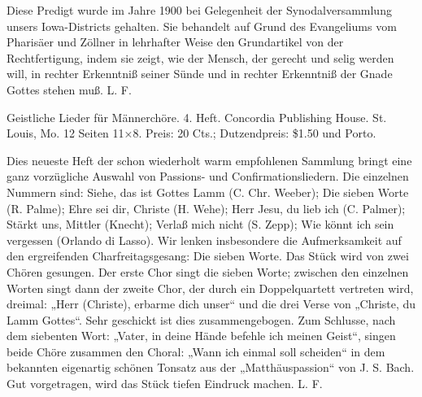 Diese Predigt wurde im Jahre 1900 bei Gelegenheit der Synodalversammlung unsers Iowa-Districts gehalten. Sie behandelt auf Grund des Evangeliums vom Pharisäer und Zöllner in lehrhafter Weise den Grundartikel von der Rechtfertigung, indem sie zeigt, wie der Mensch, der gerecht und selig werden will, in rechter Erkenntniß seiner Sünde und in rechter Erkenntniß der Gnade Gottes stehen muß. L. F.

Geistliche Lieder für Männerchöre. 4. Heft. Concordia Publishing House. St. Louis, Mo. 12 Seiten 11×8. Preis: 20 Cts.; Dutzendpreis: \$1.50 und Porto.

Dies neueste Heft der schon wiederholt warm empfohlenen Sammlung bringt eine ganz vorzügliche Auswahl von Passions- und Confirmationsliedern. Die einzelnen Nummern sind: Siehe, das ist Gottes Lamm (C. Chr. Weeber); Die sieben Worte (R. Palme); Ehre sei dir, Christe (H. Wehe); Herr Jesu, du lieb ich (C. Palmer); Stärkt uns, Mittler (Knecht); Verlaß mich nicht (S. Zepp); Wie könnt ich sein vergessen (Orlando di Lasso). Wir lenken insbesondere die Aufmerksamkeit auf den ergreifenden Charfreitagsgesang: Die sieben Worte. Das Stück wird von zwei Chören gesungen. Der erste Chor singt die sieben Worte; zwischen den einzelnen Worten singt dann der zweite Chor, der durch ein Doppelquartett vertreten wird, dreimal: „Herr (Christe), erbarme dich unser“ und die drei Verse von „Christe, du Lamm Gottes“. Sehr geschickt ist dies zusammengebogen. Zum Schlusse, nach dem siebenten Wort: „Vater, in deine Hände befehle ich meinen Geist“, singen beide Chöre zusammen den Choral: „Wann ich einmal soll scheiden“ in dem bekannten eigenartig schönen Tonsatz aus der „Matthäuspassion“ von J. S. Bach. Gut vorgetragen, wird das Stück tiefen Eindruck machen. L. F.
